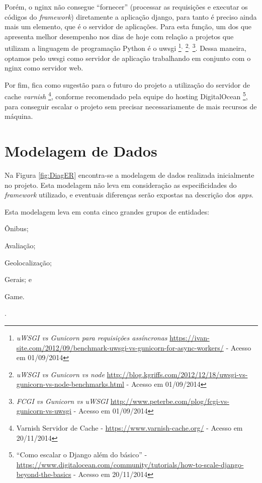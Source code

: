 Porém, o \gls{nginx} não consegue ``fornecer'' (processar as requisições e executar os códigos do \textit{framework}) diretamente a aplicação \gls{django}, para tanto é preciso ainda mais um elemento, que é o servidor de aplicações. Para esta função, um dos que apresenta melhor desempenho nos dias de hoje com relação a projetos que utilizam a linguagem de programação Python é o \gls{uwsgi}%
\footnote{\textit{uWSGI vs Gunicorn para requisições assíncronas} \url{https://ivan-site.com/2012/09/benchmark-uwsgi-vs-gunicorn-for-async-workers/} - Acesso em 01/09/2014}$^,$%
\footnote{\textit{uWSGI vs Gunicorn vs node} \url{http://blog.kgriffs.com/2012/12/18/uwsgi-vs-gunicorn-vs-node-benchmarks.html} - Acesso em 01/09/2014}$^,$%
\footnote{\textit{FCGI vs Gunicorn vs uWSGI} \url{http://www.peterbe.com/plog/fcgi-vs-gunicorn-vs-uwsgi} - Acesso em 01/09/2014}.
Dessa maneira, optamos pelo \gls{uwsgi} como servidor de aplicação trabalhando em conjunto com o \gls{nginx} como servidor web.

Por fim, fica como sugestão para o futuro do projeto a utilização do servidor de cache \textit{varnish}%
\footnote{Varnish Servidor de Cache - \url{https://www.varnish-cache.org/} - Acesso em 20/11/2014}, conforme recomendado pela equipe do hosting DigitalOcean%
\footnote{``Como escalar o Django além do básico'' - \url{https://www.digitalocean.com/community/tutorials/how-to-scale-django-beyond-the-basics} - Acesso em 20/11/2014}, para conseguir escalar o projeto sem precisar necessariamente de mais recursos de máquina.

\section{Modelagem de Dados}\label{sec:diagrama-er}
Na Figura \ref{fig:DiagER} encontra-se a modelagem de dados realizada inicialmente no projeto. Esta modelagem não leva em consideração as especificidades do \textit{framework} utilizado, e eventuais diferenças serão expostas na descrição dos \textit{apps}.

Esta modelagem leva em conta cinco grandes grupos de entidades:
    \begin{enumerate*}[label=\itshape\alph*\upshape)]
        \item Ônibus;
        \item Avaliação;
        \item Geolocalização;
        \item Gerais; e
        \item Game.
    \end{enumerate*}.

